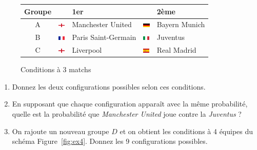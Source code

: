 \documentclass{../ficheTDTP}
\begin{document}
\begin{enumerate}
\begin{figure}[ht]
\begin{tabular}{|c|ll|ll|}
\hline
Groupe & & 1er & & 2ème \\ \hline
A & \includegraphics[height=0.2cm]{flags/en.png} & Manchester United & \includegraphics[height=0.2cm]{flags/de.png} & Bayern Munich \\ \hline
B & \includegraphics[height=0.2cm]{flags/fr.png} & Paris Saint-Germain & \includegraphics[height=0.2cm]{flags/it.png} & Juventus \\ \hline
C & \includegraphics[height=0.2cm]{flags/en.png} & Liverpool & \includegraphics[height=0.2cm]{flags/es.png} & Real Madrid \\ \hline
\end{tabular}

\caption{Conditions à 3 matchs}
\label{fig:ex3}
\end{figure}

\begin{enumerate}
\item Donnez les deux configurations possibles selon ces conditions.

\item En supposant que chaque configuration apparaît avec la même probabilité, quelle est la probabilité que \textit{Manchester United} joue contre la \textit{Juventus} ?

\item On rajoute un nouveau groupe $D$ et on obtient les conditions à 4 équipes du schéma Figure~\ref{fig:ex4}. Donnez les 9 configurations possibles.


\end{enumerate}
\end{enumerate}
\end{document}
